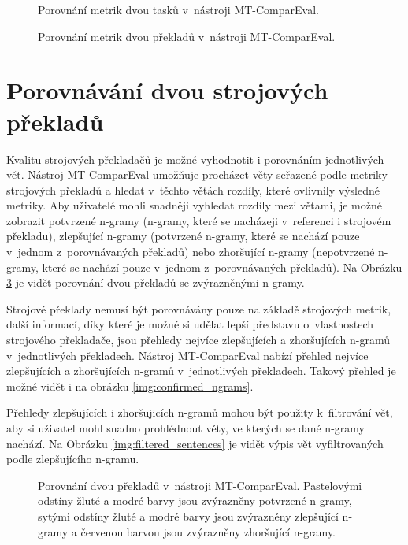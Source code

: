 \begin{figure}
	\caption{Porovnání metrik dvou tasků v~nástroji MT-ComparEval.}
	\label{img:compare_metrics_tasks}
\end{figure}

\begin{figure}
	\caption{Porovnání metrik dvou překladů v~nástroji MT-ComparEval.}
	\label{img:compare_metrics_sentences}
\end{figure}


\section{Porovnávání dvou strojových překladů}
Kvalitu strojových překladačů je možné vyhodnotit i porovnáním jednotlivých vět.
Nástroj MT-ComparEval umožňuje procházet věty seřazené podle metriky strojových překladů 
  a hledat v~těchto větách rozdíly,
  které ovlivnily výsledné metriky.
Aby uživatelé mohli snadněji vyhledat rozdíly mezi větami,
	  je možné zobrazit potvrzené \mbox{n-gramy} (\mbox{n-gramy}, které se nacházeji v~referenci i strojovém překladu),
	  zlepšující \mbox{n-gramy} (potvrzené \mbox{n-gramy}, které se nachází pouze v~jednom z~porovnávaných překladů)
	  nebo zhoršující \mbox{n-gramy} (nepotvrzené \mbox{n-gramy}, které se nachází pouze v~jednom z~porovnávaných překladů).
	Na Obrázku \ref{img:compare_sentences} je vidět porovnání dvou překladů se zvýrazněnými \mbox{n-gramy}.

	Strojové překlady nemusí být porovnávány pouze na základě strojových metrik,
	  další informací,
	  díky které je možné si udělat lepší představu o~vlastnostech strojového překladače,
	  jsou přehledy nejvíce zlepšujících a zhoršujících \mbox{n-gramů} v~jednotlivých překladech.
	Nástroj MT-ComparEval nabízí přehled nejvíce zlepšujících a zhoršujících \mbox{n-gramů}
	  v~jednotlivých překladech.
	Takový přehled je možné vidět i na obrázku \ref{img:confirmed_ngrams}.

	Přehledy zlepšujících i zhoršujicích \mbox{n-gramů} mohou být použity k~filtrování vět,
	  aby si uživatel mohl snadno prohlédnout věty,
	  ve kterých se dané \mbox{n-gramy} nachází.
	Na Obrázku \ref{img:filtered_sentences} je vidět výpis vět vyfiltrovaných podle zlepšujícího \mbox{n-gramu}.

	\begin{figure}
		\caption{
			Porovnání dvou překladů v~nástroji MT-ComparEval.
			Pastelovými odstíny žluté a modré barvy jsou zvýrazněny potvrzené \mbox{n-gramy},
			sytými odstíny žluté a modré barvy jsou zvýrazněny zlepšující \mbox{n-gramy}
			a červenou barvou jsou zvýrazněny zhoršující \mbox{n-gramy}.
		}
		\label{img:compare_sentences}
	\end{figure}

